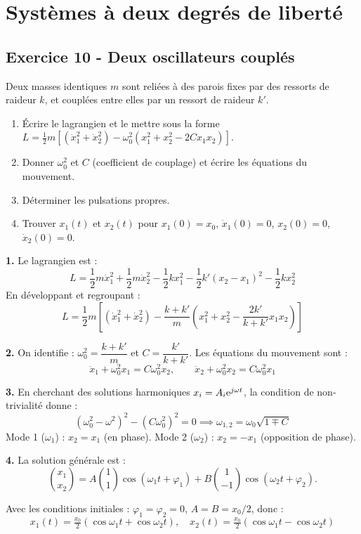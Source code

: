 \documentclass[12pt,a4paper]{article}
\begin{document}
\section{Systèmes à deux degrés de liberté}

\clearpage
\subsection*{Exercice 10 - Deux oscillateurs couplés \niveau{\difficile}}

\begin{boiteexercice}
Deux masses identiques $m$ sont reliées à des parois fixes par des ressorts de raideur $k$, et couplées entre elles par un ressort de raideur $k'$.
\begin{enumerate}
  \item Écrire le lagrangien et le mettre sous la forme $L = \frac{1}{2}m[(\dot x_1^2+\dot x_2^2) - \omega_0^2(x_1^2+x_2^2-2Cx_1x_2)]$.
  \item Donner $\omega_0^2$ et $C$ (coefficient de couplage) et écrire les équations du mouvement.
  \item Déterminer les pulsations propres.
  \item Trouver $x_1(t)$ et $x_2(t)$ pour $x_1(0)=x_0$, $\dot x_1(0)=0$, $x_2(0)=0$, $\dot x_2(0)=0$.
\end{enumerate}
\end{boiteexercice}

\begin{boitecorrige}
\textbf{1.} Le lagrangien est :
\[
L = \frac{1}{2}m\dot x_1^2 + \frac{1}{2}m\dot x_2^2 - \frac{1}{2}kx_1^2 - \frac{1}{2}k'(x_2-x_1)^2 - \frac{1}{2}kx_2^2
\]
En développant et regroupant :
\[
L = \frac{1}{2}m\left[(\dot x_1^2+\dot x_2^2) - \frac{k+k'}{m}\left(x_1^2+x_2^2-\frac{2k'}{k+k'}x_1x_2\right)\right]
\]

\textbf{2.} On identifie : $\omega_0^2 = \dfrac{k+k'}{m}$ et $C = \dfrac{k'}{k+k'}$. Les équations du mouvement sont :
\[
\ddot x_1 + \omega_0^2 x_1 = C\omega_0^2 x_2, \qquad \ddot x_2 + \omega_0^2 x_2 = C\omega_0^2 x_1
\]

\textbf{3.} En cherchant des solutions harmoniques $x_i = A_i\mathrm{e}^{j\omega t}$, la condition de non-trivialité donne :
\[
(\omega_0^2-\omega^2)^2 - (C\omega_0^2)^2 = 0 \implies \omega_{1,2} = \omega_0\sqrt{1 \mp C}
\]
Mode 1 ($\omega_1$) : $x_2 = x_1$ (en phase). Mode 2 ($\omega_2$) : $x_2 = -x_1$ (opposition de phase).

\textbf{4.} La solution générale est :
\[
\binom{x_1}{x_2} = A\binom{1}{1}\cos(\omega_1 t+\varphi_1) + B\binom{1}{-1}\cos(\omega_2 t+\varphi_2).
\]

Avec les conditions initiales : $\varphi_1=\varphi_2=0$, $A=B=x_0/2$, donc :
\[
x_1(t) = \tfrac{x_0}{2}(\cos\omega_1 t + \cos\omega_2 t), \quad x_2(t) = \tfrac{x_0}{2}(\cos\omega_1 t - \cos\omega_2 t)
\]
\end{boitecorrige}
\end{document}

